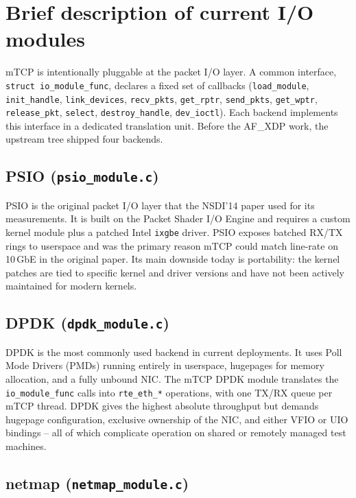 \documentclass[10pt, letterpaper, twocolumn]{article}
\begin{document}
\section{Brief description of current I/O modules}

mTCP is intentionally pluggable at the packet I/O layer. A common interface, \texttt{struct io\_module\_func}, declares a fixed set of callbacks (\texttt{load\_module}, \texttt{init\_handle}, \texttt{link\_devices}, \texttt{recv\_pkts}, \texttt{get\_rptr}, \texttt{send\_pkts}, \texttt{get\_wptr}, \texttt{release\_pkt}, \texttt{select}, \texttt{destroy\_handle}, \texttt{dev\_ioctl}). Each backend implements this interface in a dedicated translation unit. Before the AF\_XDP work, the upstream tree shipped four backends.

\subsection{PSIO (\texttt{psio\_module.c})}

PSIO is the original packet I/O layer that the NSDI'14 paper used for its measurements. It is built on the Packet Shader I/O Engine and requires a custom kernel module plus a patched Intel \texttt{ixgbe} driver. PSIO exposes batched RX/TX rings to userspace and was the primary reason mTCP could match line-rate on 10\,GbE in the original paper. Its main downside today is portability: the kernel patches are tied to specific kernel and driver versions and have not been actively maintained for modern kernels.

\subsection{DPDK (\texttt{dpdk\_module.c})}

DPDK is the most commonly used backend in current deployments. It uses Poll Mode Drivers (PMDs) running entirely in userspace, hugepages for memory allocation, and a fully unbound NIC. The mTCP DPDK module translates the \texttt{io\_module\_func} calls into \texttt{rte\_eth\_*} operations, with one TX/RX queue per mTCP thread. DPDK gives the highest absolute throughput but demands hugepage configuration, exclusive ownership of the NIC, and either VFIO or UIO bindings -- all of which complicate operation on shared or remotely managed test machines.

\subsection{netmap (\texttt{netmap\_module.c})}
\end{document}
